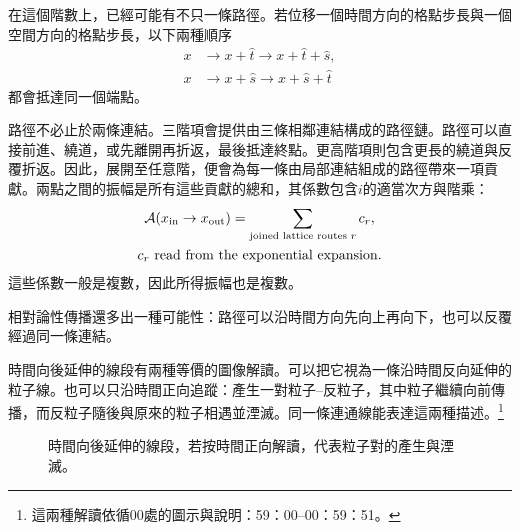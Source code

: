 在這個階數上，已經可能有不只一條路徑。若位移一個時間方向的格點步長與一個空間方向的格點步長，以下兩種順序
\begin{align}
x
&\longrightarrow x+\hat t
\longrightarrow x+\hat t+\hat s,\\
x
&\longrightarrow x+\hat s
\longrightarrow x+\hat s+\hat t
\end{align}
都會抵達同一個端點。

\begin{classroomqa}
\end{classroomqa}

路徑不必止於兩條連結。三階項會提供由三條相鄰連結構成的路徑鏈。路徑可以直接前進、繞道，或先離開再折返，最後抵達終點。更高階項則包含更長的繞道與反覆折返。因此，展開至任意階，便會為每一條由局部連結組成的路徑帶來一項貢獻。兩點之間的振幅是所有這些貢獻的總和，其係數包含\(i\)的適當次方與階乘：
\begin{equation}
\begin{gathered}
\mathcal{A}(x_{\mathrm{in}}\to x_{\mathrm{out}})
=
\sum_{\text{joined lattice routes }r}c_r,
\\
c_r\ \hbox{read from the exponential expansion}.
\end{gathered}
\end{equation}
這些係數一般是複數，因此所得振幅也是複數。

相對論性傳播還多出一種可能性：路徑可以沿時間方向先向上再向下，也可以反覆經過同一條連結。

\begin{classroomqa}
\end{classroomqa}

時間向後延伸的線段有兩種等價的圖像解讀。可以把它視為一條沿時間反向延伸的粒子線。也可以只沿時間正向追蹤：產生一對粒子--反粒子，其中粒子繼續向前傳播，而反粒子隨後與原來的粒子相遇並湮滅。同一條連通線能表達這兩種描述。\footnote{這兩種解讀依循00處的圖示與說明：59：00--00：59：51。}

\begin{figure}[htbp]
\centering
{}
\caption{時間向後延伸的線段，若按時間正向解讀，代表粒子對的產生與湮滅。}
\end{figure}

